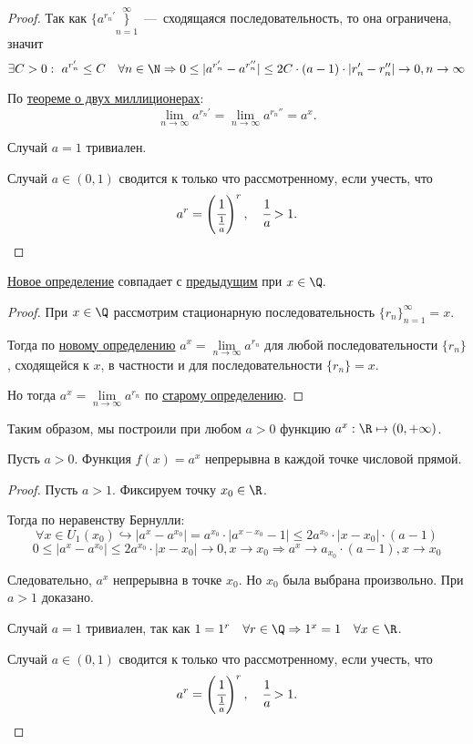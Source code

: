 \begin{proof}
    Так как $\{a^{r_{n}'}\}\limits_{n = 1}^{\infty}$~---~сходящаяся последовательность, то она ограничена, значит
    $$
    \exists C> 0: \ a^{r_{n}'} \leq C \quad \forall n \in \N \Rightarrow 0 \leq |a^{r_{n}'} - a^{r_{n}''}| \leq 2C \cdot (a-1) \cdot |r_{n}' - r_{n}''| \to 0, n \to \infty
    $$

    По \hyperlink{thm2.4}{теореме о двух миллиционерах}: $$\lim\limits_{n \to \infty} a^{r_{n}'} = \lim\limits_{n \to \infty} a^{r_{n}''} = a^{x}.
    $$

    Случай $a = 1$ тривиален.

    Случай $a \in (0, 1)$ сводится к только что рассмотренному, если учесть, что 
    $$\displaystyle a^{r} = \left(\cfrac{1}{\frac{1}{a}}\right)^r, \quad \cfrac{1}{a} > 1.$$
\end{proof}
\begin{lemma}
    \hyperlink{thmdef4.2}{Новое определение} совпадает с \hyperlink{def4.33}{предыдущим} при $x \in \Q.$
\end{lemma}
\begin{proof}
     При $x \in \Q$ рассмотрим стационарную последовательность $\displaystyle \{r_{n}\}_{n = 1}^{\infty} = x.$

    Тогда по \hyperlink{thmdef4.2}{новому определению} $a^x = \lim\limits_{n \to \infty} a^{r_{n}}$ для любой последовательности $\{r_{n}\}$, сходящейся к $x$, в частности и для последовательности  $\{r_{n}\} = x$.

    Но тогда $a^x = \lim\limits_{n \to \infty} a^{r_{n}}$ по \hyperlink{def4.33}{старому определению}.
\end{proof}

    Таким образом, мы построили при любом $a > 0$ функцию $a^{x}: \R \mapsto (0, +\infty)$.
    
\begin{theorem}
    Пусть $a > 0$. Функция $f(x) = a^{x}$ непрерывна в каждой точке числовой прямой.
\end{theorem}
\begin{proof}
    Пусть $a > 1$.
    Фиксируем точку $x_{0} \in \R$.

    Тогда по неравенству Бернулли:
    $$\forall x \in U_{1}(x_{0}) \hookrightarrow |a^{x} - a^{x_{0}}| = a^{x_{0}}\cdot|a^{x-x_{0}} - 1| \leq 2 a^{x_{0}} \cdot |x - x_{0}| \cdot (a-1)
    $$
    $$
    0 \leq |a^{x} - a^{x_{0}}| \leq 2 a^{x_{0}} \cdot |x - x_{0}| \to 0, x \to x_{0} \Rightarrow a^{x} \to a_{x_{0}}\cdot (a-1), x \to x_{0}
    $$

    Следовательно, $a^{x}$ непрерывна в точке $x_{0}$. Но $x_{0}$ была выбрана произвольно. При $a > 1$ доказано.
    
    Случай $a = 1$ тривиален, так как $1 = 1^{r} \quad \forall r \in \Q \Rightarrow 1^{x} = 1  \quad \forall x \in \R$.

    Случай $a \in (0, 1)$ сводится к только что рассмотренному, если учесть, что 
    $$a^{r} = \left(\cfrac{1}{\frac{1}{a}}\right)^r, \quad \cfrac{1}{a} > 1.$$
\end{proof}
